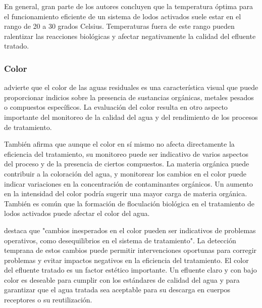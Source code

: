 En general, gran parte de los autores concluyen que la temperatura óptima para el funcionamiento eficiente de un sistema de lodos activados suele estar en el rango de 20 a 30 grados Celsius. Temperaturas fuera de este rango pueden ralentizar las reacciones biológicas y afectar negativamente la calidad del efluente tratado.
\subsubsection{Color}
\cite{crites2000} advierte que el color de las aguas residuales es una característica visual que puede proporcionar indicios sobre la presencia de sustancias orgánicas, metales pesados o compuestos específicos. La evaluación del color resulta en otro aspecto importante del monitoreo de la calidad del agua y del rendimiento de los procesos de tratamiento.\par
También \cite{lazcano2016} afirma que aunque el color en sí mismo no afecta directamente la eficiencia del tratamiento, su monitoreo puede ser indicativo de varios aspectos del proceso y de la presencia de ciertos compuestos. La materia orgánica puede contribuir a la coloración del agua, y monitorear los cambios en el color puede indicar variaciones en la concentración de contaminantes orgánicos. Un aumento en la intensidad del color podría sugerir una mayor carga de materia orgánica. También es común que la formación de floculación biológica en el tratamiento de lodos activados puede afectar el color del agua.\par
\cite{Eckenfelder2000} destaca que "cambios inesperados en el color pueden ser indicativos de problemas operativos, como desequilibrios en el sistema de tratamiento". La detección temprana de estos cambios puede permitir intervenciones oportunas para corregir problemas y evitar impactos negativos en la eficiencia del tratamiento. El color del efluente tratado es un factor estético importante. Un efluente claro y con bajo color es deseable para cumplir con los estándares de calidad del agua y para garantizar que el agua tratada sea aceptable para su descarga en cuerpos receptores o su reutilización.
